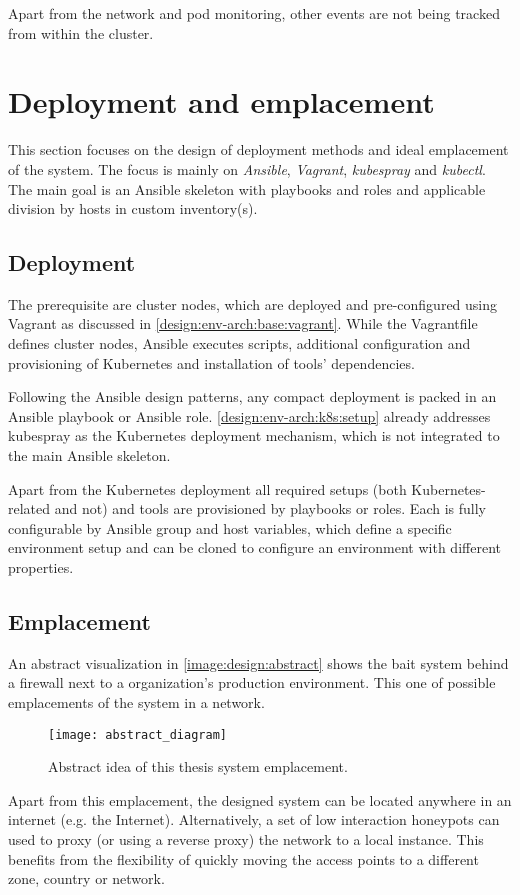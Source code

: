 Apart from the network and pod monitoring, other events are not being tracked from within the cluster.

\section{Deployment and emplacement \label{design:deployment}}
This section focuses on the design of deployment methods and ideal emplacement of the system. The focus is mainly on \textit{Ansible}, \textit{Vagrant}, \textit{kubespray} and \textit{kubectl}. The main goal is an Ansible skeleton with playbooks and roles and applicable division by hosts in custom inventory(s).

\subsection{Deployment \label{design:deployment:deploy}}
The prerequisite are cluster nodes, which are deployed and pre-configured using Vagrant as discussed in \autoref{design:env-arch:base:vagrant}. While the Vagrantfile defines cluster nodes, Ansible executes scripts, additional configuration and provisioning of Kubernetes and installation of tools' dependencies.

Following the Ansible design patterns, any compact deployment is packed in an Ansible playbook or Ansible role. \autoref{design:env-arch:k8s:setup} already addresses kubespray as the Kubernetes deployment mechanism, which is not integrated to the main Ansible skeleton.

Apart from the Kubernetes deployment all required setups (both Kubernetes-related and not) and tools are provisioned by playbooks or roles. Each is fully configurable by Ansible group and host variables, which define a specific environment setup and can be cloned to configure an environment with different properties.

\subsection{Emplacement \label{design:deployment:place}}
An abstract visualization in \autoref{image:design:abstract} shows the bait system behind a firewall next to a organization's production environment. This one of possible emplacements of the system in a network. 

\begin{figure}[h]
	\centering
	\texttt{[image: abstract\_diagram]}
	\caption{Abstract idea of this thesis system emplacement.}
	\label{image:design:abstract}
\end{figure}

Apart from this emplacement, the designed system can be located anywhere in an internet (e.g. the Internet). Alternatively, a set of low interaction honeypots can used to proxy (or using a reverse proxy) the network to a local instance. This benefits from the flexibility of quickly moving the access points to a different zone, country or network.

